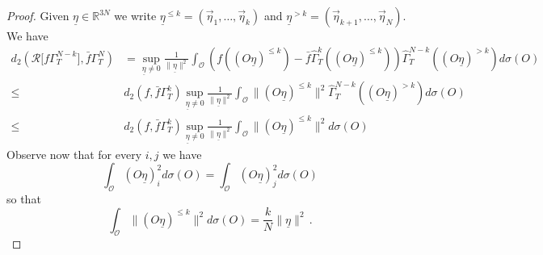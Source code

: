 \documentclass{article}
\newcommand \ul[1]{\underline{#1}}
\newcommand*\R{ \mathds{R} }
\begin{document}
\begin{proof}
Given $\ul \eta\in\R^{3N}$ we write $\ul \eta^{\leq k}=(\vec \eta_1,\ldots, \vec \eta_k)$ and $\ul \eta^{> k}=(\vec 
\eta_{k+1},\ldots, \vec \eta_N)$. We have
\[
\begin{aligned}
d_2\left(\mathcal R\bigl[f\Gamma^{N-k}_T\bigr],\bar f\Gamma^N_T\right)&=
\sup_{\ul\eta\not=0}\frac1{\|\ul \eta\|^2}\int_{\mathcal O}\left(f( (O\ul \eta)^{\leq k})-\bar f\widehat\Gamma^{k}_T( (O\ul 
\eta)^{\leq 
k})\right)\widehat\Gamma_T^{N-k}((O\ul \eta)^{>k})d\sigma(O)\\
\leq&d_2(f,\bar f\Gamma^k_T)\sup_{\ul\eta\not=0}\frac1{\|\ul \eta\|^2}\int_{\mathcal O}\|(O\ul \eta)^{\leq 
k}\|^2\widehat\Gamma_T^{N-k}((O\ul \eta)^{>k})d\sigma(O)\\
\leq&d_2(f,\bar f\Gamma^k_T)\sup_{\ul\eta\not=0}\frac1{\|\ul \eta\|^2}\int_{\mathcal O}\|(O\ul \eta)^{\leq 
k}\|^2d\sigma(O)
\end{aligned}
\]
Observe now that for every $i,j$ we have 
\[
\int_{\mathcal O}(O\ul \eta)_i^2d\sigma(O)=\int_{\mathcal O}(O\ul \eta)_j^2d\sigma(O)
\]
so that
\[
\int_{\mathcal O}\|(O\ul \eta)^{\leq k}\|^2d\sigma(O)=\frac kN \|\ul\eta\|^2\, .
\]
\end{proof}




\end{document}
